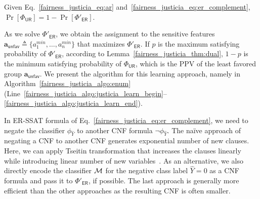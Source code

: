 \begin{lemma}\label{fairness_justicia_thm:dual}
Given Eq.~\eqref{fairness_justicia_eq:ar} and~\eqref{fairness_justicia_eq:er_complement},	$ \Pr[\Phi_{\mathsf{UR}}] = 1 - \Pr[\Phi'_{\mathsf{ER}}]  $.
\end{lemma}
As we solve $\Phi'_{\mathsf{ER}}$, we obtain the assignment to the sensitive features $\mathbf{a}_{\mathsf{unfav}} \triangleq \{a^{min}_1, \dots, a^{min}_n\}$ that maximizes $\Phi'_{\mathsf{ER}}$. 
If $ p $ is the maximum satisfying probability of $ \Phi'_{\mathsf{ER}} $, according to Lemma~\ref{fairness_justicia_thm:dual}, $ 1 - p $ is the minimum satisfying probability of $ \Phi_{\mathsf{UR}} $,  which is the PPV of the least favored group $ \mathbf{a}_{\mathsf{unfav}}$. We present the algorithm for this learning approach, namely {\justicialearn} in Algorithm~\ref{fairness_justicia_algo:enum} (Line~\ref{fairness_justicia_algo:justicia_learn_begin}--\ref{fairness_justicia_algo:justicia_learn_end}).

\iffalse
\begin{algorithm}[t!]
	\caption{\justicialearn: Learning ER-SSAT Encoding}
	\label{fairness_justicia_algo:learn}
	\begin{algorithmic}[1]
		\Function{{\justicialearn}}{$ X,A,\hat{Y} $}
		\State $ \phi_{\hat{Y}} = \mathsf{CNF}(\hat{Y}  = 1) $
		\State $ p_{i} = \mathsf{CalculateProb}(x_i), \forall x_i \in X $
		\State $  \Phi_\mathbf{ER} = \exists a_1,\dots, \exists a_n, \R^{p_{1}}x_1, \dots, \R^{p_{m}}x_m. \; \phi_{\hat{Y}} $
		\State $  \Phi'_\mathbf{ER} = \exists a_1,\dots, \exists a_n, \R^{p_{1}}x_1, \dots, \R^{p_{m}}x_m. \; \neg \phi_{\hat{Y}} $
		\State \Return $ \mathsf{SSAT}(\Phi_\mathbf{ER}), 1 - \mathsf{SSAT}(\Phi'_\mathbf{ER}) $
		\EndFunction
	\end{algorithmic}
\end{algorithm}
\fi

In ER-SSAT formula of Eq.~\eqref{fairness_justicia_eq:er_complement}, we need to negate the classifier $ \phi_{\hat{Y}} $ to another CNF formula $ \neg \phi_{\hat{Y}} $. The na\"ive approach of negating a CNF to another CNF generates exponential number of new clauses. Here, we can apply Tseitin transformation that increases the clauses linearly while introducing linear number of new variables~\cite{tseitin1983complexity}. As an alternative, we also directly encode the classifier $\mathcal{M}$ for the negative class label $\hat{Y} = 0$ as a CNF formula and pass it to $\Phi'_{\mathsf{ER}} $, if possible. The last approach is generally more efficient than the other approaches as the resulting CNF is often smaller. 



